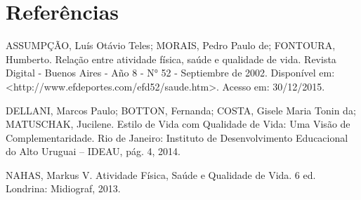 \documentclass[article,12pt,onesidea,4paper,english,brazil,]{abntex2}
\begin{document}
	\sloppy
	\section*{Referências}
	
	\noindent ASSUMPÇÃO, Luís Otávio Teles; MORAIS, Pedro Paulo de; FONTOURA, Humberto. Relação entre atividade física, saúde e qualidade de vida. Revista Digital - Buenos Aires - Año 8 - N° 52 - Septiembre de 2002. Disponível em:
	<http://www.efdeportes.com/efd52/saude.htm>. Acesso em: 30/12/2015.
	
	\noindent DELLANI, Marcos Paulo; BOTTON, Fernanda; COSTA, Gisele Maria Tonin da; MATUSCHAK, Jucilene. Estilo de Vida com Qualidade de Vida: Uma Visão de Complementaridade. Rio de Janeiro: Instituto de Desenvolvimento Educacional do Alto Uruguai – IDEAU, pág. 4, 2014.
	
	\noindent NAHAS, Markus V. Atividade Física, Saúde e Qualidade de Vida. 6 ed. Londrina: Midiograf, 2013.
	
	
\end{document}
